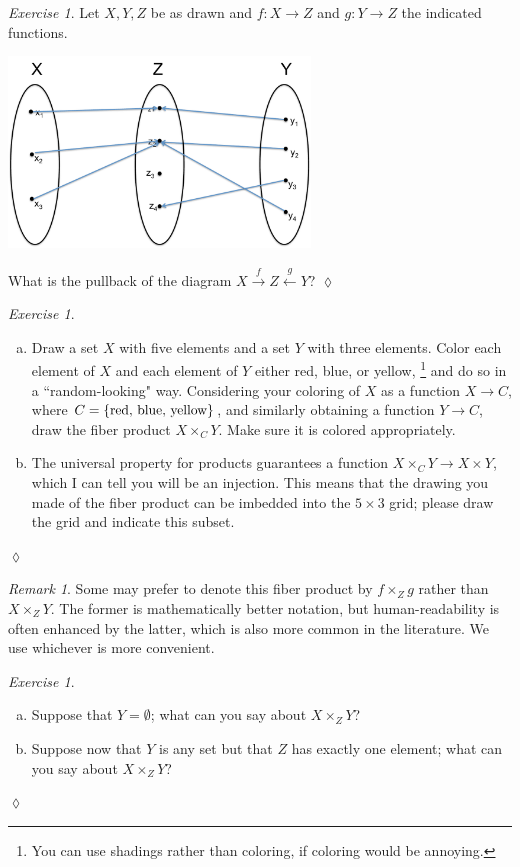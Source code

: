 \documentclass{book}
\def\tn{\textnormal}
\def\to{\rightarrow}
\def\taking{\colon}
\newcommand{\Too}[1]{\xrightarrow{\ \ #1\ \ }}
\newcommand{\Fromm}[1]{\xleftarrow{\ \ #1\ \ }}
\theoremstyle{remark}
\newtheorem{remark}[subsubsection]{Remark}
\newtheorem{exc}[subsubsection]{Exercise}
\newenvironment{exercise}{\begin{exc}}{\hspace*{\fill}$\lozenge$\end{exc}}
\theoremstyle{definition}
\def\sexc{\begin{enumerate}[a.)]\setlength{\itemsep}{.1cm}\setlength{\parskip}{.1cm}\item}
\def\next{\item}
\def\endsexc{\end{enumerate}}
\begin{document}
\begin{exercise}
Let $X,Y,Z$ be as drawn and $f\taking X\to Z$ and $g\taking Y\to Z$ the indicated functions. 
\begin{center}
\includegraphics[height=2in]{setPullback}
\end{center}
What is the pullback of the diagram $X\Too{f}Z\Fromm{g}Y$?
\end{exercise}

\begin{exercise}~
\sexc Draw a set $X$ with five elements and a set $Y$ with three elements. Color each element of $X$ and each element of $Y$ either red, blue, or yellow,
\footnote{You can use shadings rather than coloring, if coloring would be annoying.}
and do so in a ``random-looking" way. Considering your coloring of $X$ as a function $X\to C$, where $C=\{\tn{red, blue, yellow}\}$, and similarly obtaining a function $Y\to C$, draw the fiber product $X\times_CY$. Make sure it is colored appropriately.
\next The universal property for products guarantees a function $X\times_CY\to X\times Y$, which I can tell you will be an injection. This means that the drawing you made of the fiber product can be imbedded into the $5\times 3$ grid; please draw the grid and indicate this subset.
\endsexc
\end{exercise}

\begin{remark}

Some may prefer to denote this fiber product by $f\times_Zg$ rather than $X\times_ZY$. The former is  mathematically better notation, but human-readability is often enhanced by the latter, which is also more common in the literature. We use whichever is more convenient.

\end{remark}

\begin{exercise}~
\sexc Suppose that $Y=\emptyset$; what can you say about $X\times_ZY$? 
\next Suppose now that $Y$ is any set but that $Z$ has exactly one element; what can you say about $X\times_ZY$?
\endsexc
\end{exercise}
\end{document}
